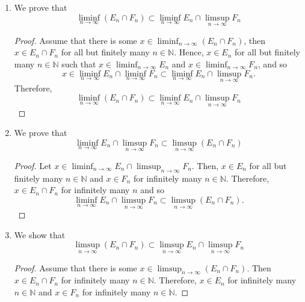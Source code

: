 \documentclass[12pt]{article}
\newcommand{\N}{\mathbb{N}}
\newenvironment{problem}[2][Problem]{\begin{trivlist}
		\item[\hskip \labelsep {\bfseries #1}\hskip \labelsep {\bfseries #2.}]}{\end{trivlist}}
\begin{document}
\begin{problem}{1}
\begin{enumerate}[label=(\alph*)]
\begin{enumerate}[label=\textbf{\arabic*.}]
	\item We prove that
	\begin{equation*}
		\liminf_{n\to \infty} \left(E_{n}\cap F_{n}\right) \subset \liminf_{n\to \infty} E_{n} \cap \limsup_{n\to \infty}F_{n} 
	\end{equation*}
	\begin{proof}
		Assume that there is some $x\in \liminf_{n\to \infty} \left(E_{n}\cap F_{n}\right)$, then $x\in E_{n}\cap F_{n}$ for all but finitely many $n\in \N$. Hence, $x\in E_{n}$ for all but finitely many $n\in \N$ such that $x\in \liminf_{n\to \infty} E_{n}$ and $x\in \liminf_{n\to \infty} F_{n}$, and so 
		\begin{equation*}
		x\in \liminf_{n\to \infty} E_{n} \cap \liminf_{n\to \infty} F_{n} \subset \liminf_{n\to \infty} E_{n} \cap \limsup_{n\to \infty} F_{n}. 
		\end{equation*}
		Therefore,
		\begin{equation*}
			\liminf_{n\to \infty} \left(E_{n}\cap F_{n}\right) \subset \liminf_{n\to \infty} E_{n} \cap \limsup_{n\to \infty}F_{n}
		\end{equation*}
	\end{proof}

	\item We prove that
	\begin{equation*}
		\liminf_{n\to \infty} E_{n} \cap \limsup_{n\to \infty} F_{n} \subset \limsup_{n\to \infty} \left(E_{n} \cap F_{n}\right)
	\end{equation*}
	\begin{proof}
		Let $x\in \liminf_{n\to \infty} E_{n} \cap \limsup_{n\to \infty} F_{n}$. Then, $x\in E_{n}$ for all but finitely many $n\in \N$ and $x\in F_{n}$ for infinitely many $n\in \N$. Therefore, $x\in E_{n}\cap F_{n}$ for infinitely many $n$ and so 
		\begin{equation*}
			\liminf_{n\to \infty} E_{n} \cap \limsup_{n\to \infty} F_{n} \subset \limsup_{n\to \infty} \left(E_{n} \cap F_{n}\right).
		\end{equation*}
	\end{proof}

	\item We show that  
	\begin{equation*}
		\limsup_{n\to \infty} \left(E_{n}\cap F_{n}\right) \subset \limsup_{n\to \infty}E_{n} \cap \limsup_{n\to \infty} F_{n}
	\end{equation*}
	\begin{proof}
		Assume that there is some $x\in \limsup_{n\to \infty} \left(E_{n}\cap F_{n}\right)$. Then $x\in E_{n}\cap F_{n}$ for infinitely many $n\in \N$. Therefore, $x\in E_{n}$ for infinitely many $n\in \N$ and $x\in F_{n}$ for infinitely many $n\in \N$.
	\end{proof}
	\end{enumerate}


\end{enumerate}
\end{problem}
\end{document}

